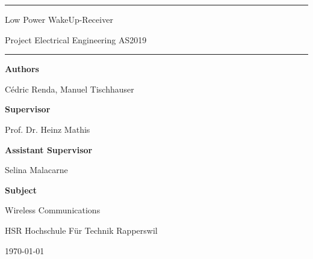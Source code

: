 \documentclass[a4paper,12pt]{book}
\begin{document}
\pagestyle{fancy}
\lhead{}
\rhead{}
\frontmatter
\newcommand\HRule{\noindent\rule{\linewidth}{1.5pt}}



\hypersetup{
	colorlinks=true,
	linktoc=all,
	linkcolor=blue
}


\newtheorem{satz}{Theorem}[chapter]
\newtheorem{problem}[satz]{Problem}
\newtheorem{hilfssatz}[satz]{Lemma}
\newtheorem{definition}[satz]{Definition}
\newtheorem{annahme}[satz]{Assumption}
\newtheorem{aufgabe}[satz]{Task}
\newenvironment{beispiel}[1][Example]{%
	\begin{proof}[#1]%
		\renewcommand{\qedsymbol}{$\bigcirc$}
	}{\end{proof}}


\begin{titlepage}
\HRule
\vspace*{10pt}
\begin{flushright}
{\Huge
Low Power WakeUp-Receiver}

\end{flushright}
\begin{flushright}
{\Large Project Electrical Engineering AS2019}
\end{flushright}
\HRule

\vspace{70pt}
\large
\textbf{Authors}

Cédric Renda, Manuel Tischhauser

\textbf{Supervisor}

Prof. Dr. Heinz Mathis

\textbf{Assistant Supervisor}

Selina Malacarne

\textbf{Subject}

Wireless Communications



\begin{center}
HSR Hochschule Für Technik Rapperswil

\today
\end{center}
\end{titlepage}



\tableofcontents

\mainmatter








\end{document}
